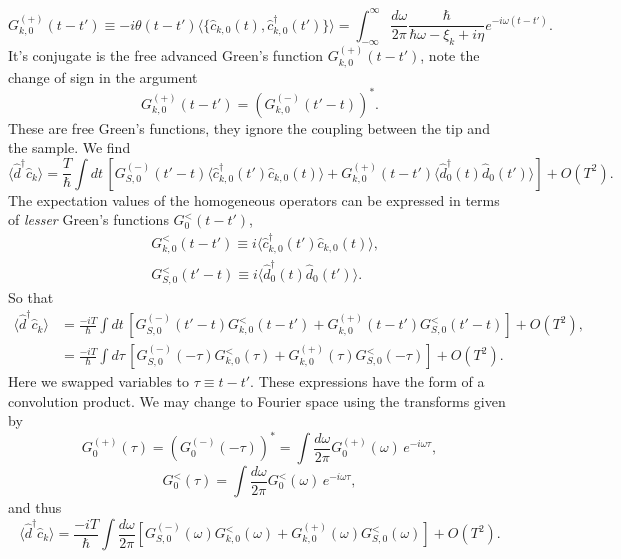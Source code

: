\begin{equation}
    G_{k,0}^{(+)}(t-t') \equiv  -i \theta(t-t')\langle \{\hat{c}_{k,0}(t), \hat{c}_{k,0}^\dagger(t')\} \rangle = \int_{-\infty}^{\infty}\frac{d\omega}{2\pi}\frac{\hbar}{\hbar\omega-\xi_k+i\eta}e^{-i\omega (t-t')}.
\end{equation}
It's conjugate is the free advanced Green's function $G_{k,0}^{(+)}(t-t')$, note the change of sign in the argument
\begin{equation}
    G_{k,0}^{(+)}(t-t') = \left(G_{k,0}^{(-)}(t'-t)\right)^*.
\end{equation}
These are free Green's functions, they ignore the coupling between the tip and the sample. We find
\begin{equation}
    \langle\hat{d}^\dagger\hat{c}_k\rangle = \frac{T}{\hbar}\int dt \, \left[G_{S,0}^{(-)}(t'-t)\langle \hat{c}_{k,0}^\dagger(t') \hat{c}_{k,0}(t)\rangle 
    +G_{k,0}^{(+)}(t-t')\langle\hat{d}_0^\dagger(t)\hat{d}_0(t')\rangle\right] + O(T^2).
\end{equation}
The expectation values of the homogeneous operators can be expressed in terms of \textit{lesser} Green's functions $G_{0}^{<}(t-t')$,
\begin{eqnarray}
    &G_{k,0}^<(t-t') \equiv i\langle\hat{c}_{k,0}^\dagger(t')\hat{c}_{k,0}(t)\rangle, \\
    &G_{S,0}^<(t'-t) \equiv i\langle\hat{d}_{0}^\dagger(t)\hat{d}_{0}(t')\rangle.
\end{eqnarray}
So that
\begin{align}
     \langle\hat{d}^\dagger\hat{c}_k\rangle &= \frac{-iT}{\hbar}\int dt \, \left[G_{S,0}^{(-)}(t'-t)G_{k,0}^<(t-t')
    +G_{k,0}^{(+)}(t-t')G_{S,0}^<(t'-t)\right] + O(T^2), \nonumber\\
    &= \frac{-iT}{\hbar} \int d\tau\, \left[G_{S,0}^{(-)}(-\tau)G_{k,0}^<(\tau) + G_{k,0}^{(+)}(\tau)G_{S,0}^<(-\tau)\right] + O(T^2).
\end{align}
Here we swapped variables to $\tau \equiv t-t'$. These expressions have the form of a convolution product. We may change to Fourier space using the transforms given by
\begin{equation}
    G^{(+)}_0(\tau) = (G^{(-)}_0(-\tau))^* = \int \frac{d\omega}{2\pi} G^{(+)}_0(\omega)\,e^{-i\omega\tau},
\end{equation}
\begin{equation}
    G^<_0(\tau) = \int \frac{d\omega}{2\pi}G^<_0(\omega)\,e^{-i\omega\tau},
\end{equation}
and thus
\begin{equation}
     \langle\hat{d}^\dagger\hat{c}_k\rangle = \frac{-iT}{\hbar}\int\frac{d\omega}{2\pi}\left[G^{(-)}_{S,0}(\omega)G_{k,0}^<(\omega) + G_{k,0}^{(+)}(\omega)G_{S,0}^<(\omega)\right] + O(T^2).
\end{equation}
